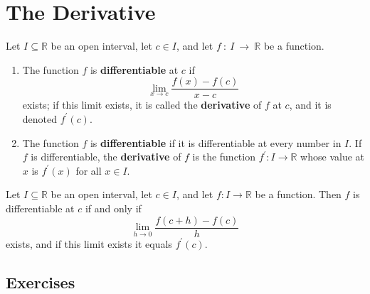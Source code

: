 \section{The Derivative}
\begin{definition}
	\label{definition-4.2.1}
	Let $I \subseteq \mathbb{R}$ be an open interval, let $c \in I$, and let $f~:~I~\to~\mathbb{R}$ be a function.
	\begin{enumerate}
		\item The function $f$ is \textbf{differentiable} at $c$ if
		\begin{equation}
		\label{equation-definition-4.2.1}
		\lim\limits_{x \to c} \frac{f(x) - f(c)}{x - c}
		\end{equation}
		exists; if this limit exists, it is called the \textbf{derivative} of $f$ at $c$, and it is denoted $f^\prime (c)$.
		\item The function $f$ is \textbf{differentiable} if it is differentiable at every number in $I$. If $f$ is differentiable, the \textbf{derivative} of $f$ is the function $f^\prime : I \to \mathbb{R}$ whose value at $x$ is $f^\prime (x)$ for all $x \in I$.
	\end{enumerate}
\end{definition}

\begin{lemma}
	\label{lemma-4.2.2}
	Let $I \subseteq \mathbb{R}$ be an open interval, let $c \in I$, and let $f:I\to\mathbb{R}$ be a function. Then $f$ is differentiable at $c$ if and only if
	\begin{equation}
	\label{equation-lemma-4.2.2}
	\lim\limits_{h \to 0} \frac{f \left( c + h \right) - f \left( c \right)}{h}
	\end{equation}
	exists, and if this limit exists it equals $f^\prime \left( c \right)$.
\end{lemma}

\subsection{Exercises}
